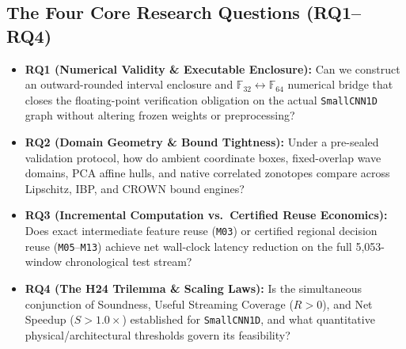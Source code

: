 \documentclass[11pt,a4paper]{article}
\newcommand{\F}{\mathbb{F}}
\newcommand{\code}[1]{{\small\ttfamily\nolinkurl{#1}}}
\theoremstyle{remark}
\begin{document}
\subsection{The Four Core Research Questions (RQ1--RQ4)}
\begin{itemize}
  \item \textbf{RQ1 (Numerical Validity \& Executable Enclosure):} Can we construct an outward-rounded interval enclosure and $\F_{32} \leftrightarrow \F_{64}$ numerical bridge that closes the floating-point verification obligation on the actual \code{SmallCNN1D} graph without altering frozen weights or preprocessing?
  \item \textbf{RQ2 (Domain Geometry \& Bound Tightness):} Under a pre-sealed validation protocol, how do ambient coordinate boxes, fixed-overlap wave domains, PCA affine hulls, and native correlated zonotopes compare across Lipschitz, IBP, and CROWN bound engines?
  \item \textbf{RQ3 (Incremental Computation vs.\ Certified Reuse Economics):} Does exact intermediate feature reuse (\code{M03}) or certified regional decision reuse (\code{M05}--\code{M13}) achieve net wall-clock latency reduction on the full 5,053-window chronological test stream?
  \item \textbf{RQ4 (The H24 Trilemma \& Scaling Laws):} Is the simultaneous conjunction of Soundness, Useful Streaming Coverage ($R > 0$), and Net Speedup ($S > 1.0\times$) established for \code{SmallCNN1D}, and what quantitative physical/architectural thresholds govern its feasibility?
\end{itemize}
\end{document}
